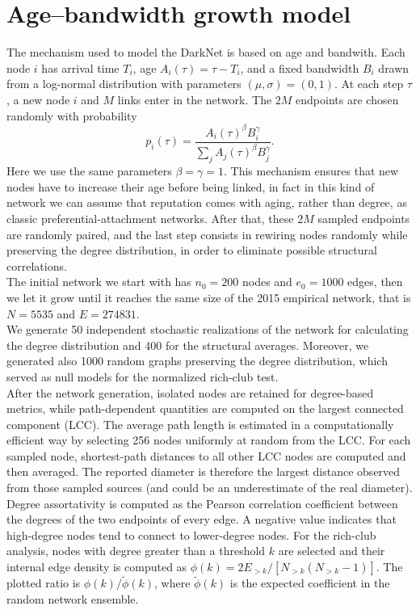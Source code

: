 \begingroup\small

\section{Age--bandwidth growth model}
The mechanism used to model the DarkNet is based on age and bandwith. Each node $i$ has
arrival time $T_i$, age $A_i(\tau)=\tau-T_i$, and a fixed bandwidth $B_i$ drawn
from a log-normal distribution with parameters $(\mu,\sigma)=(0,1)$. At each step $\tau$, a new node $i$ and $M$ links enter in the network. The $2M$ endpoints
are chosen randomly with probability
\[
 p_i(\tau)=\frac{A_i(\tau)^\beta B_i^\gamma}
 {\sum_j A_j(\tau)^\beta B_j^\gamma}.
\]
Here we use the same parameters $\beta=\gamma=1$. This mechanism ensures that new nodes have to increase their age before being linked, in fact in this kind of network we can assume that reputation comes with aging, rather than degree, as classic preferential-attachment networks.
 After that, these $2M$ sampled endpoints are randomly paired, and the last step consists in rewiring nodes randomly while preserving the
degree distribution, in order to eliminate possible structural correlations.\\
The initial network we start with has $n_0=200$ nodes and $e_0=1000$ edges, then we let it 
grow until it reaches the same size of the 2015 empirical network, that is $N=5535$ and $E=274831$. \\
We generate 50 independent stochastic realizations of the network for calculating the
degree distribution and 400 for the structural averages. Moreover, we generated also 1000 random graphs
preserving the degree distribution, which served as null models for the normalized rich-club test. \\
After the network generation, isolated nodes are retained for degree-based metrics, while path-dependent quantities are computed on the largest connected component (LCC).
The average path length is estimated in a computationally efficient way by selecting 256 nodes uniformly at random from the LCC. For each sampled node,
 shortest-path distances to all other LCC nodes are computed and then averaged. The reported diameter is therefore the largest distance observed from those sampled sources (and could be an underestimate of the real diameter). 
 Degree assortativity is computed as the Pearson correlation coefficient between the degrees of the two endpoints of every edge. A negative value indicates that high-degree nodes tend to connect to
lower-degree nodes.
For the rich-club analysis, nodes with degree greater than a threshold $k$ are
selected and their internal edge density is computed as
$\phi(k)=2E_{>k}/[N_{>k}(N_{>k}-1)]$. The plotted ratio is
$\phi(k)/\widetilde{\phi}(k)$, where $\widetilde{\phi}(k)$ is the expected coefficient in the random network ensemble.
 
